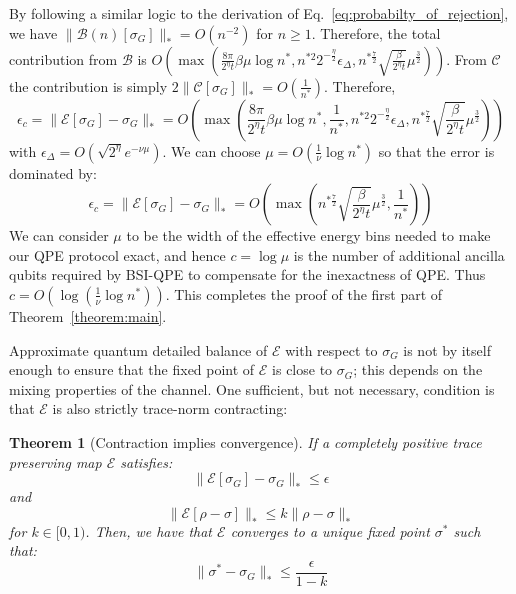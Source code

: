 \documentclass[aps,floatfix,10pt,amssymb,amsfont,amsmath,superscriptaddress,float,nofootinbib,longbibliography,nobalancelastpage,twocolumn]{revtex4-2}
\newtheorem{theorem}{Theorem}
\begin{document}
\begin{widetext}
\begin{equation}
\end{equation}
By following a similar logic to the derivation of Eq.~\eqref{eq:probabilty_of_rejection}, we have $\|\mathcal B(n)[\sigma_G]\|_* = O(n^{-2})$ for $n\geq1$. Therefore, the total contribution from $\mathcal{B}$ is $O(\!\max(\frac{8\pi}{2^{\eta}t}\beta \mu \log n^*,n^{*2}2^{-\frac{\eta}{2}}\epsilon_{\Delta},n^{*\frac{7}{2}}\sqrt{\frac{\beta }{2^{\eta}t}}\mu^{\frac{3}{2}}))$. From $\mathcal{C}$ the contribution is simply $2\|\mathcal{C}[\sigma_G]\|_* = O(\frac{1}{n^*})$. Therefore,
 \begin{equation}
   \epsilon_c = \|\mathcal{E}[\sigma_G] - \sigma_G\|_* = O\left(\max\left( \frac{8\pi}{2^{\eta}t}\beta\mu \log n^* ,\frac{1}{n^*}, n^{*2}2^{-\frac{\eta}{2}}\epsilon_{\Delta},n^{*\frac{7}{2}}\sqrt{\frac{\beta }{2^{\eta}t}}\mu^{\frac{3}{2}}\right)\right)
\end{equation}
with $\epsilon_{\Delta}=O(\sqrt{2^{\eta}}e^{-\nu\mu})$. We can choose $\mu = O(\frac{1}{\nu}\log n^*)$ so that the error is dominated by:
 \begin{equation}
   \epsilon_c = \|\mathcal{E}[\sigma_G] - \sigma_G\|_* = O\left(\max\left( n^{*\frac{7}{2}}\sqrt{\frac{\beta }{2^{\eta}t}}\mu^{\frac{3}{2}} ,\frac{1}{n^*}\right)\right)
    \label{eq:error_bound}
\end{equation}
We can consider $\mu$ to be the width of the effective energy bins needed to make our QPE protocol exact, and hence $c=\log\mu$ is the number of additional ancilla qubits required by BSI-QPE to compensate for the inexactness of QPE. Thus $c=O(\log(\frac{1}{\nu}\log n^*))$.
This completes the proof of the first part of Theorem~\ref{theorem:main}.
\end{widetext}
 Approximate quantum detailed balance of $\mathcal{E}$ with respect to $\sigma_G$ is not by itself enough to ensure that the fixed point of $\mathcal{E}$ is close to $\sigma_G$; this depends on the mixing properties of the channel. One sufficient, but not necessary, condition is that $\mathcal{E}$ is also strictly trace-norm contracting:
 \begin{theorem}[Contraction implies convergence]
     If a completely positive trace preserving map $\mathcal{E}$ satisfies:
     \begin{equation}
         \|\mathcal{E}[\sigma_G] - \sigma_G\|_* \leq \epsilon
     \end{equation}
     and
 \begin{equation}
     \|\mathcal{E}[\rho-\sigma]\|_* \leq k\|\rho-\sigma\|_*
 \end{equation}
 for $k \in [0,1)$. Then, we have that $\mathcal{E}$ converges to a unique fixed point $\sigma^*$ such that:
 \begin{equation}
     \| \sigma^* -\sigma_G\|_* \leq \frac{\epsilon}{1-k}
 \end{equation}
 \label{theorem:error_bound}
 \end{theorem}
\end{document}
